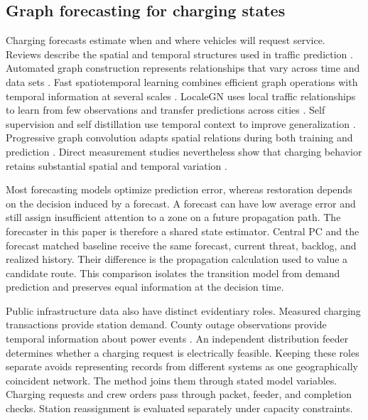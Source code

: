 \documentclass[journal]{IEEEtran}
\begin{document}
\subsection{Graph forecasting for charging states}

Charging forecasts estimate when and where vehicles will request service.
Reviews describe the spatial and temporal structures used in traffic
prediction \cite{jiang2023survey,rahmani2023gnnits,yin2022deep}.
Automated graph construction represents relationships that vary across time
and data sets \cite{jin2023autodstsgn}.  Fast spatiotemporal learning combines
efficient graph operations with temporal information at several scales
\cite{guo2023fast}.  LocaleGN uses local traffic relationships to learn from
few observations and transfer predictions across cities \cite{li2023few}.
Self supervision and self distillation use temporal context to improve
generalization \cite{ji2023self}.  Progressive graph convolution adapts spatial
relations during both training and prediction \cite{shin2024pgcn}.  Direct
measurement studies nevertheless show that charging behavior retains substantial
spatial and temporal variation \cite{martz2022charging}.

Most forecasting models optimize prediction error, whereas restoration depends
on the decision induced by a forecast.  A forecast can have low average error
and still assign insufficient attention to a zone on a future propagation path.
The forecaster in this paper is therefore a shared state estimator.  Central PC
and the forecast matched baseline receive the same forecast, current threat,
backlog, and realized history.  Their difference is the propagation calculation
used to value a candidate route.  This comparison isolates the transition model
from demand prediction and preserves equal information at the decision time.

Public infrastructure data also have distinct evidentiary roles.  Measured
charging transactions provide station demand.  County outage observations
provide temporal information about power events \cite{brelsford2024eaglei}.
An independent distribution feeder determines whether a charging request is
electrically feasible.  Keeping these roles separate avoids representing
records from different systems as one geographically coincident network.  The
method joins them through stated model variables.  Charging requests and crew
orders pass through packet, feeder, and completion checks.  Station
reassignment is evaluated separately under capacity constraints.
\end{document}
